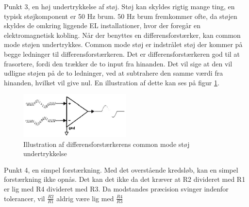 Punkt 3, en høj undertrykkelse af støj. Støj kan skyldes rigtig mange ting, en typisk støjkomponent er 50 Hz brum. 50 Hz brum fremkommer ofte, da støjen skyldes de omkring liggende EL installationer, hvor der foregår en elektromagnetisk kobling. Når der benyttes en differensforstærker, kan common mode støjen undertrykkes. Common mode støj er indstrålet støj der kommer på begge ledninger til differensforstærkeren. Det er differensforstærkeren god til at frasortere, fordi den trækker de to input fra hinanden. Det vil sige at den vil udligne støjen på de to ledninger, ved at subtrahere den samme værdi fra hinanden, hvilket vil give nul. En illustration af dette kan ses på figur \ref{fig:differensNoise}\citep{ASBbog}. 
\begin{figure}[H]
	\centering
	\includegraphics[width=0.5\textwidth]{billeder/Hardware/differensnoise.jpg}
	\caption{Illustration af differensforstærkerens common mode støj undertrykkelse}
	\label{fig:differensNoise}
\end{figure}

Punkt 4, en simpel forstærkning. Med det overstående kredsløb, kan en simpel forstærkning ikke opnås. Det kan det ikke da det kræver at R2 divideret med R1 er lig med R4 divideret med R3. Da modstandes præcision svinger indenfor tolerancer, vil $\frac{R2}{R1}$ aldrig være lig med $\frac{R4}{R3}$

